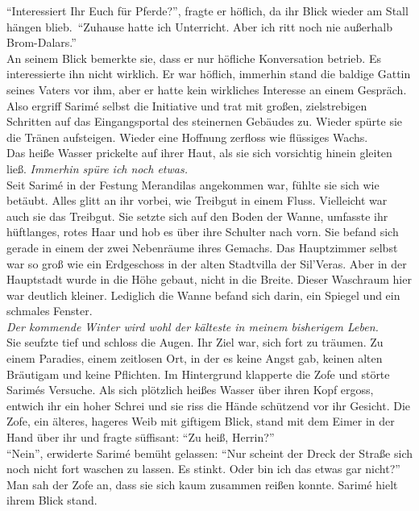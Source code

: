``Interessiert Ihr Euch für Pferde?'', fragte er höflich, da ihr Blick wieder am Stall hängen 
blieb.\ 
``Zuhause hatte ich Unterricht. Aber ich ritt noch nie außerhalb Brom-Dalars.''\\
An seinem Blick bemerkte sie, dass er nur höfliche Konversation betrieb. Es interessierte ihn nicht 
wirklich. Er war höflich, immerhin stand die baldige Gattin seines Vaters vor ihm, aber er hatte 
kein wirkliches Interesse an einem Gespräch. Also ergriff Sarimé selbst die Initiative und trat mit 
großen, zielstrebigen Schritten auf das Eingangsportal des steinernen Gebäudes zu. Wieder spürte 
sie die Tränen aufsteigen. Wieder eine Hoffnung zerfloss wie flüssiges Wachs. \\


Das heiße Wasser prickelte auf ihrer Haut, als sie sich vorsichtig hinein gleiten ließ. 
\textit{Immerhin spüre ich noch etwas.}\\
Seit Sarimé in der Festung Merandilas angekommen war, fühlte sie sich wie betäubt. Alles glitt an 
ihr vorbei, wie Treibgut in einem Fluss. Vielleicht war auch sie das Treibgut. Sie setzte sich auf 
den Boden der Wanne, umfasste ihr hüftlanges, rotes Haar und hob es über ihre Schulter nach vorn. 
Sie befand sich gerade in einem der zwei Nebenräume ihres Gemachs. Das Hauptzimmer selbst war so 
groß wie ein Erdgeschoss in der alten Stadtvilla der Sil'Veras. Aber in der Hauptstadt wurde in die 
Höhe gebaut, nicht in die Breite. Dieser Waschraum hier war deutlich kleiner. Lediglich die Wanne 
befand sich darin, ein Spiegel und ein schmales Fenster.\\
\textit{Der kommende Winter wird wohl der kälteste in meinem bisherigem Leben.}\\
Sie seufzte tief und schloss die Augen. Ihr Ziel war, sich fort zu träumen. Zu einem Paradies, einem 
zeitlosen Ort, in der es keine Angst gab, keinen alten Bräutigam und keine Pflichten. Im Hintergrund 
klapperte die Zofe und störte Sarimés Versuche. Als sich plötzlich heißes Wasser über ihren Kopf 
ergoss, entwich ihr ein hoher Schrei und sie riss die Hände schützend vor ihr Gesicht. Die Zofe, ein 
älteres, hageres Weib mit giftigem Blick, stand mit dem Eimer in der Hand über ihr und fragte 
süffisant: ``Zu heiß, Herrin?''\\
``Nein'', erwiderte Sarimé bemüht gelassen: ``Nur scheint der Dreck der Straße sich noch nicht fort 
waschen zu lassen. Es stinkt. Oder bin ich das etwas gar nicht?''\\
Man sah der Zofe an, dass sie sich kaum zusammen reißen konnte. Sarimé hielt ihrem Blick stand. 
